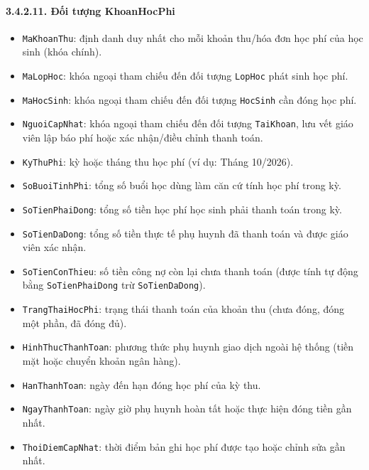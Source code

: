 \documentclass[12pt,a4paper]{article}
\begin{document}
\paragraph{3.4.2.11. Đối tượng KhoanHocPhi}\mbox{}
\begin{itemize}\setlength{\itemsep}{2pt}\setlength{\parskip}{0pt}
    \item \texttt{MaKhoanThu}: định danh duy nhất cho mỗi khoản thu/hóa đơn học phí của học sinh (khóa chính).
    \item \texttt{MaLopHoc}: khóa ngoại tham chiếu đến đối tượng \texttt{LopHoc} phát sinh học phí.
    \item \texttt{MaHocSinh}: khóa ngoại tham chiếu đến đối tượng \texttt{HocSinh} cần đóng học phí.
    \item \texttt{NguoiCapNhat}: khóa ngoại tham chiếu đến đối tượng \texttt{TaiKhoan}, lưu vết giáo viên lập báo phí hoặc xác nhận/điều chỉnh thanh toán.
    \item \texttt{KyThuPhi}: kỳ hoặc tháng thu học phí (ví dụ: Tháng 10/2026).
    \item \texttt{SoBuoiTinhPhi}: tổng số buổi học dùng làm căn cứ tính học phí trong kỳ.
    \item \texttt{SoTienPhaiDong}: tổng số tiền học phí học sinh phải thanh toán trong kỳ.
    \item \texttt{SoTienDaDong}: tổng số tiền thực tế phụ huynh đã thanh toán và được giáo viên xác nhận.
    \item \texttt{SoTienConThieu}: số tiền công nợ còn lại chưa thanh toán (được tính tự động bằng \texttt{SoTienPhaiDong} trừ \texttt{SoTienDaDong}).
    \item \texttt{TrangThaiHocPhi}: trạng thái thanh toán của khoản thu (chưa đóng, đóng một phần, đã đóng đủ).
    \item \texttt{HinhThucThanhToan}: phương thức phụ huynh giao dịch ngoài hệ thống (tiền mặt hoặc chuyển khoản ngân hàng).
    \item \texttt{HanThanhToan}: ngày đến hạn đóng học phí của kỳ thu.
    \item \texttt{NgayThanhToan}: ngày giờ phụ huynh hoàn tất hoặc thực hiện đóng tiền gần nhất.
    \item \texttt{ThoiDiemCapNhat}: thời điểm bản ghi học phí được tạo hoặc chỉnh sửa gần nhất.
\end{itemize}
\end{document}
